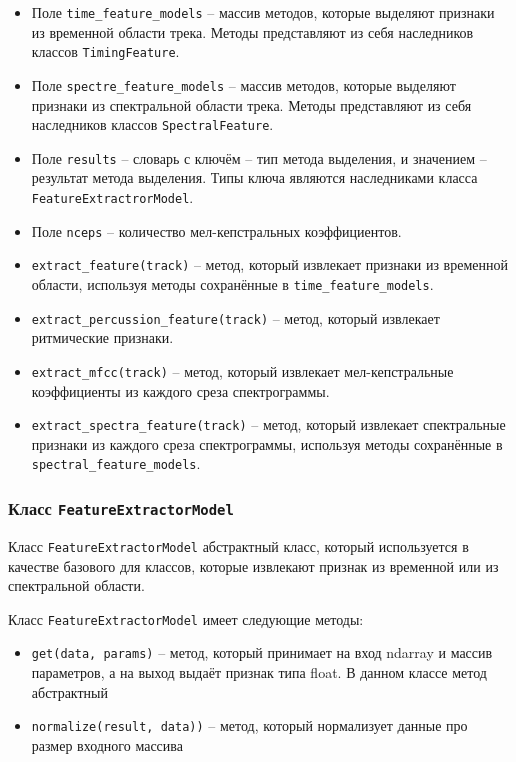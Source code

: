 \begin{itemize}
\item{Поле \texttt{time\_feature\_models} -- массив методов, которые выделяют признаки из временной области трека. Методы представляют из себя наследников классов \texttt{TimingFeature}.}
\item{Поле \texttt{spectre\_feature\_models} -- массив методов, которые выделяют признаки из спектральной области трека. Методы представляют из себя наследников классов \texttt{SpectralFeature}.}
\item{Поле \texttt{results} -- словарь с ключём -- тип метода выделения, и значением -- результат метода выделения. Типы ключа являются наследниками класса \texttt{FeatureExtractrorModel}. }
\item{Поле \texttt{nceps} -- количество мел-кепстральных коэффициентов.}
\item{\texttt{extract\_feature(track)} -- метод, который извлекает признаки из временной области, используя методы сохранённые в \texttt{time\_feature\_models}.}
\item{\texttt{extract\_percussion\_feature(track)} -- метод, который извлекает ритмические признаки.}
\item{\texttt{extract\_mfcc(track)} -- метод, который извлекает мел-кепстральные коэффициенты из каждого среза спектрограммы. }
\item{\texttt{extract\_spectra\_feature(track)} -- метод, который извлекает спектральные признаки из каждого среза спектрограммы, используя методы сохранённые в \texttt{spectral\_feature\_models}.}
\end{itemize}

\subsubsection{Класс \texttt{FeatureExtractorModel}}

Класс \texttt{FeatureExtractorModel} абстрактный класс, который используется в качестве базового для классов, которые извлекают признак из временной или из спектральной области.

Класс \texttt{FeatureExtractorModel} имеет следующие методы:

\begin{itemize}
\item{\texttt{get(data, params)} -- метод, который принимает на вход ndarray и массив параметров, а на выход выдаёт признак типа float. В данном классе метод абстрактный }
\item{\texttt{normalize(result, data))} -- метод, который нормализует данные про размер входного массива}
\end{itemize}



